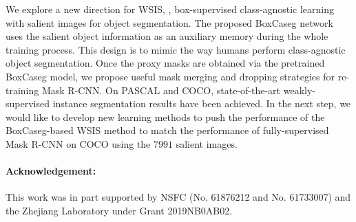 \documentclass[final]{cvpr}
\begin{document}
We explore a new direction for WSIS, \ie, box-supervised class-agnostic learning with salient images for object segmentation. The proposed BoxCaseg network uses the salient object information as an auxiliary memory during the whole training process. This design is to mimic the way humans perform class-agnostic object segmentation. Once the proxy masks are obtained via the pretrained BoxCaseg model, we propose useful mask merging and dropping strategies for re-training Mask R-CNN. On PASCAL and COCO, state-of-the-art weakly-supervised instance segmentation results have been achieved. In the next step, we would like to develop new learning methods to push the performance of the BoxCaseg-based WSIS method to match the performance of fully-supervised Mask R-CNN on COCO using the $7991$ salient images.

\vspace{-3mm}
{\small \paragraph{Acknowledgement:} This work was in part supported by NSFC (No. 61876212 and No. 61733007) and the Zhejiang Laboratory under Grant 2019NB0AB02.}

{\small


}
\end{document}
